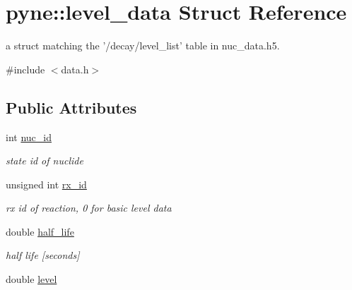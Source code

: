 \hypertarget{structpyne_1_1level__data}{\section{pyne\-:\-:level\-\_\-data Struct Reference}
\label{structpyne_1_1level__data}
}


a struct matching the '/decay/level\-\_\-list' table in nuc\-\_\-data.\-h5.  




{\ttfamily \#include $<$data.\-h$>$}

\subsection*{Public Attributes}
\begin{DoxyCompactItemize}
\item 
\hypertarget{structpyne_1_1level__data_aefac68a7a5aaedafd0b01f459e75adc8}{int \hyperlink{structpyne_1_1level__data_aefac68a7a5aaedafd0b01f459e75adc8}{nuc\-\_\-id}}\label{structpyne_1_1level__data_aefac68a7a5aaedafd0b01f459e75adc8}

\begin{DoxyCompactList}\small\item\em state id of nuclide \end{DoxyCompactList}\item 
\hypertarget{structpyne_1_1level__data_a52a8e7987f8f2a01fe7142bac5ab6adc}{unsigned int \hyperlink{structpyne_1_1level__data_a52a8e7987f8f2a01fe7142bac5ab6adc}{rx\-\_\-id}}\label{structpyne_1_1level__data_a52a8e7987f8f2a01fe7142bac5ab6adc}

\begin{DoxyCompactList}\small\item\em rx id of reaction, 0 for basic level data \end{DoxyCompactList}\item 
\hypertarget{structpyne_1_1level__data_a044daae5c914e096c423b95da1586dc0}{double \hyperlink{structpyne_1_1level__data_a044daae5c914e096c423b95da1586dc0}{half\-\_\-life}}\label{structpyne_1_1level__data_a044daae5c914e096c423b95da1586dc0}

\begin{DoxyCompactList}\small\item\em half life \mbox{[}seconds\mbox{]} \end{DoxyCompactList}\item 
\hypertarget{structpyne_1_1level__data_af029059b5f79cfa2ad22e6f9fcb04ac9}{double \hyperlink{structpyne_1_1level__data_af029059b5f79cfa2ad22e6f9fcb04ac9}{level}}\label{structpyne_1_1level__data_af029059b5f79cfa2ad22e6f9fcb04ac9}


\end{DoxyCompactItemize}
